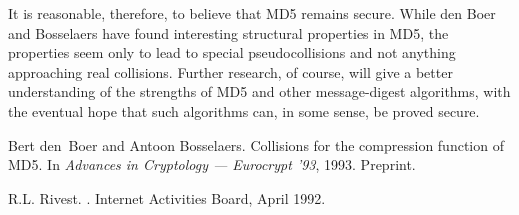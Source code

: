 It is reasonable, therefore, to believe that MD5 remains secure. While den
Boer and Bosselaers have found interesting structural properties in
MD5, the properties seem only to lead to special pseudocollisions
and not anything approaching real collisions. Further research, of
course, will give a better understanding of the strengths of MD5 and
other message-digest algorithms, with the eventual hope that
such algorithms can, in some sense, be proved secure.


\begin{thebibliography}{1}

Bert den~Boer and Antoon Bosselaers.
\newblock Collisions for the compression function of {MD5}.
\newblock In {\it Advances in Cryptology --- Eurocrypt '93}, 1993.
\newblock Preprint.

R.L. Rivest.
.
\newblock Internet Activities Board, April 1992.

\end{thebibliography}


 
